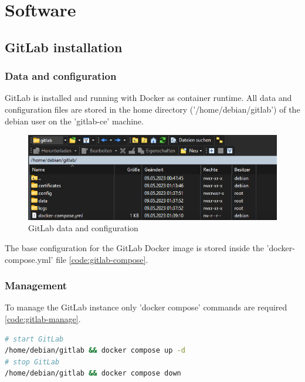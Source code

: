 \chapter{Software}

\section{GitLab installation}

\subsection{Data and configuration}

GitLab is installed and running with Docker as container runtime.
All data and configuration files are stored in the home directory ('/home/debian/gitlab') of the debian user on the 'gitlab-ce' machine.

\begin{figure}[H]
	\centering
	\includegraphics[width=14cm]{images/gitlab_contents.png}
	\caption{GitLab data and configuration}
	\label{fig:gitlab_contents}
\end{figure}

The base configuration for the GitLab Docker image is stored inside the 'docker-compose.yml' file \ref{code:gitlab-compose}.



\subsection{Management}

To manage the GitLab instance only 'docker compose' commands are required \ref{code:gitlab-manage}.
\begin{lstlisting}[language=bash,caption={Manage GitLab},label={code:gitlab-manage}]
# start GitLab
/home/debian/gitlab && docker compose up -d
# stop GitLab
/home/debian/gitlab && docker compose down
\end{lstlisting}

